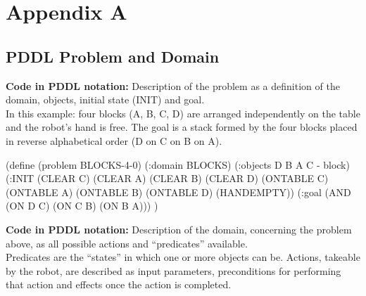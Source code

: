 \chapter{Appendix A} \label{AppendixA}

\section{PDDL Problem and Domain}\label{sec:PDDL} 

\begin{footnotesize}
\textbf{Code in PDDL notation:} Description of the problem as a definition of the domain, objects, initial state (INIT) and goal. \\
In this example: four blocks (A, B, C, D) are arranged independently on the table and the robot's hand is free. The goal is a stack formed by the four blocks placed in reverse alphabetical order (D on C on B on A).
\end{footnotesize}

\begin{python}
(define (problem BLOCKS-4-0)
	(:domain BLOCKS)
	(:objects D B A C - block)
	(:INIT (CLEAR C) (CLEAR A) (CLEAR B) (CLEAR D) 
		(ONTABLE C) (ONTABLE A) (ONTABLE B) 
		(ONTABLE D) (HANDEMPTY))
	(:goal (AND (ON D C) (ON C B) (ON B A)))
)
\end{python}

\bigskip

\begin{footnotesize}
\textbf{Code in PDDL notation:} Description of the domain, concerning the problem above, as all possible actions and \enquote{predicates} available. \\
Predicates are the \enquote{states} in which one or more objects can be. Actions, takeable by the robot, are described as input parameters, preconditions for performing that action and effects once the action is completed. 
\end{footnotesize}

